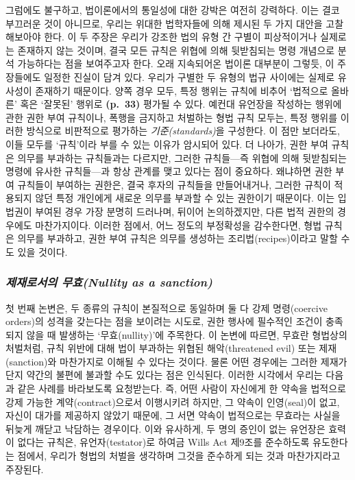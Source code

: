 \documentclass[12pt, oneside]{book}  %
\begin{document}
그럼에도 불구하고, 법이론에서의 통일성에 대한 강박은 여전히 강력하다.
이는 결코 부끄러운 것이 아니므로, 우리는 위대한 법학자들에 의해 제시된
두 가지 대안을 고찰해보아야 한다. 이 두 주장은 우리가 강조한 법의 유형
간 구별이 피상적이거나 실제로는 존재하지 않는 것이며, 결국 모든 규칙은
위협에 의해 뒷받침되는 명령 개념으로 분석 가능하다는 점을 보여주고자
한다. 오래 지속되어온 법이론 대부분이 그렇듯, 이 주장들에도 일정한
진실이 담겨 있다. 우리가 구별한 두 유형의 법규 사이에는 실제로 유사성이
존재하기 때문이다. 양쪽 경우 모두, 특정 행위는 규칙에 비추어 `법적으로
올바른' 혹은 `잘못된' 행위로 \textbf{(p.~33)} 평가될 수 있다. 예컨대
유언장을 작성하는 행위에 관한 권한 부여 규칙이나, 폭행을 금지하고
처벌하는 형법 규칙 모두는, 특정 행위를 이러한 방식으로 비판적으로
평가하는 \emph{기준(standards)}을 구성한다. 이 점만 보더라도, 이들
모두를 `규칙'이라 부를 수 있는 이유가 암시되어 있다. 더 나아가, 권한
부여 규칙은 의무를 부과하는 규칙들과는 다르지만, 그러한 규칙들---즉
위협에 의해 뒷받침되는 명령에 유사한 규칙들---과 항상 관계를 맺고 있다는
점이 중요하다. 왜냐하면 권한 부여 규칙들이 부여하는 권한은, 결국 후자의
규칙들을 만들어내거나, 그러한 규칙이 적용되지 않던 특정 개인에게 새로운
의무를 부과할 수 있는 권한이기 때문이다. 이는 입법권이 부여된 경우 가장
분명히 드러나며, 뒤이어 논의하겠지만, 다른 법적 권한의 경우에도
마찬가지이다. 이러한 점에서, 어느 정도의 부정확성을 감수한다면, 형법
규칙은 의무를 부과하고, 권한 부여 규칙은 의무를 생성하는
조리법(recipes)이라고 말할 수도 있을 것이다.

\subsubsection{\texorpdfstring{\emph{제재로서의 무효(Nullity as a
sanction)}}{제재로서의 무효(Nullity as a sanction)}}\label{uxc81cuxc7acuxb85cuxc11cuxc758-uxbb34uxd6a8nullity-as-a-sanction}

첫 번째 논변은, 두 종류의 규칙이 본질적으로 동일하며 둘 다 강제
명령(coercive orders)의 성격을 갖는다는 점을 보이려는 시도로, 권한
행사에 필수적인 조건이 충족되지 않을 때 발생하는 `무효(nullity)'에
주목한다. 이 논변에 따르면, 무효란 형법상의 처벌처럼, 규칙 위반에 대해
법이 부과하는 위협된 해악(threatened evil) 또는 제재(sanction)와
마찬가지로 이해될 수 있다는 것이다. 물론 어떤 경우에는 그러한 제재가
단지 약간의 불편에 불과할 수도 있다는 점은 인식된다. 이러한 시각에서
우리는 다음과 같은 사례를 바라보도록 요청받는다. 즉, 어떤 사람이
자신에게 한 약속을 법적으로 강제 가능한 계약(contract)으로서 이행시키려
하지만, 그 약속이 인영(seal)이 없고, 자신이 대가를 제공하지 않았기
때문에, 그 서면 약속이 법적으로는 무효라는 사실을 뒤늦게 깨닫고 낙담하는
경우이다. 이와 유사하게, 두 명의 증인이 없는 유언장은 효력이 없다는
규칙은, 유언자(testator)로 하여금 Wills Act 제9조를 준수하도록
유도한다는 점에서, 우리가 형법의 처벌을 생각하며 그것을 준수하게 되는
것과 마찬가지라고 주장된다.
\end{document}
